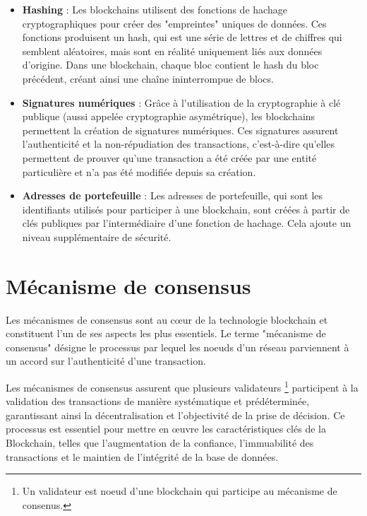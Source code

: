 \begin{itemize}
    \item \textbf{Hashing} : Les blockchains utilisent des fonctions de hachage cryptographiques pour créer des "empreintes" uniques de données. Ces fonctions produisent un hash, qui est une série de lettres et de chiffres qui semblent aléatoires, mais sont en réalité uniquement liés aux données d'origine. Dans une blockchain, chaque bloc contient le hash du bloc précédent, créant ainsi une chaîne ininterrompue de blocs.
    
    \item \textbf{Signatures numériques} : Grâce à l'utilisation de la cryptographie à clé publique (aussi appelée cryptographie asymétrique), les blockchains permettent la création de signatures numériques. Ces signatures assurent l'authenticité et la non-répudiation des transactions, c'est-à-dire qu'elles permettent de prouver qu'une transaction a été créée par une entité particulière et n'a pas été modifiée depuis sa création.
    \item \textbf{Adresses de portefeuille} :  Les adresses de portefeuille, qui sont les identifiants utilisés pour participer à une blockchain, sont créées à partir de clés publiques par l'intermédiaire d'une fonction de hachage. Cela ajoute un niveau supplémentaire de sécurité.
\end{itemize}


\section{Mécanisme de consensus} \label{ansec:meca_consensus}

Les mécanismes de consensus sont au cœur de la technologie blockchain et constituent l'un de ses aspects les plus essentiels. Le terme "mécanisme de consensus" désigne le processus par lequel les noeuds d'un réseau parviennent à un accord sur l'authenticité d'une transaction.

Les mécanismes de consensus assurent que plusieurs validateurs \footnote{Un validateur est noeud d'une blockchain qui participe au mécanisme de consenus.} participent à la validation des transactions de manière systématique et prédéterminée, garantissant ainsi la décentralisation et l'objectivité de la prise de décision. Ce processus est essentiel pour mettre en œuvre les caractéristiques clés de la Blockchain, telles que l'augmentation de la confiance, l'immuabilité des transactions et le maintien de l'intégrité de la base de données.

